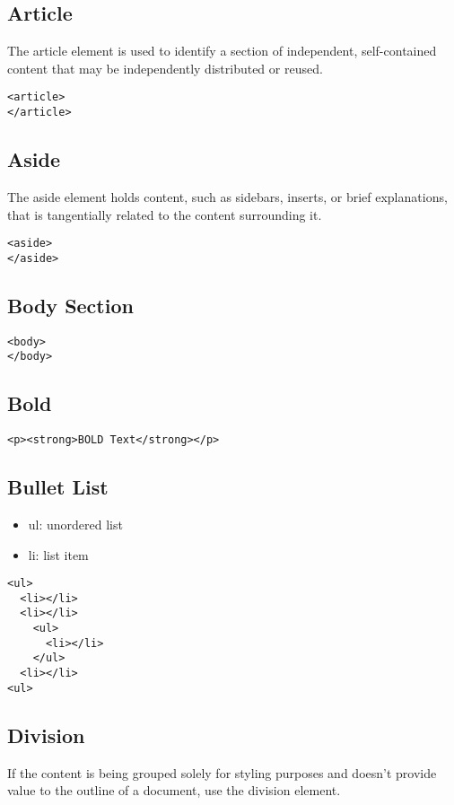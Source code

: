 \documentclass{article}
\begin{document}
\subsection{Article}
The article element is used to identify a section of independent, self-contained
content that may be independently distributed or reused.

\begin{lstlisting}
<article>
</article>
\end{lstlisting}

\subsection{Aside}
The aside element holds content, such as sidebars, inserts, or brief
explanations, that is tangentially related to the content surrounding it.

\begin{lstlisting}
<aside>
</aside>
\end{lstlisting}

\subsection{Body Section}
\begin{lstlisting}
<body>
</body>
\end{lstlisting}

\subsection{Bold}
\begin{lstlisting}
<p><strong>BOLD Text</strong></p>
\end{lstlisting}

\subsection{Bullet List}
\begin{itemize}
  \item ul: unordered list
  \item li: list item
\end{itemize}

\begin{lstlisting}
<ul>
  <li></li>
  <li></li>
    <ul>
      <li></li>
    </ul>
  <li></li>
<ul>
\end{lstlisting}

\subsection{Division}
If the content is being grouped solely for styling purposes and doesn't provide
value to the outline of a document, use the division element.
\end{document}
